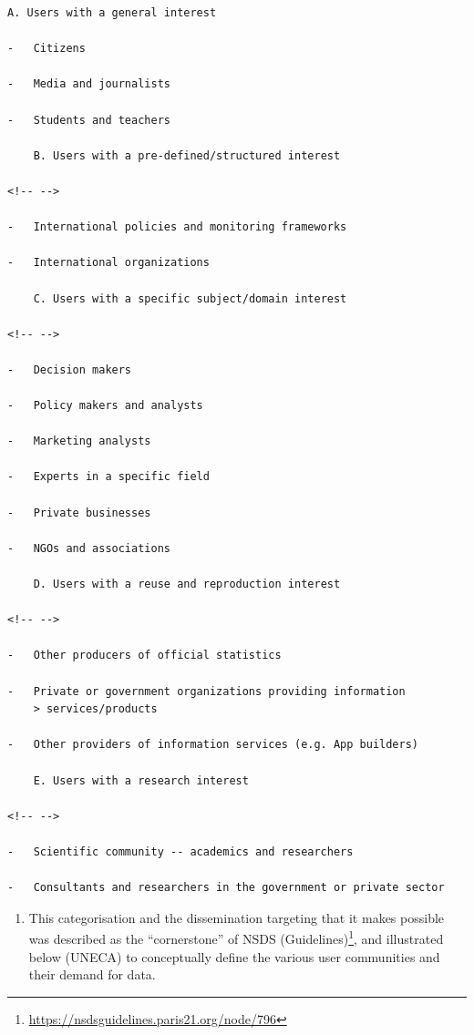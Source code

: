 \documentclass[
]{article}
\providecommand{\tightlist}{%
  \setlength{\itemsep}{0pt}\setlength{\parskip}{0pt}}
\begin{document}
\begin{verbatim}
A. Users with a general interest

-   Citizens

-   Media and journalists

-   Students and teachers

    B. Users with a pre-defined/structured interest

<!-- -->

-   International policies and monitoring frameworks

-   International organizations

    C. Users with a specific subject/domain interest

<!-- -->

-   Decision makers

-   Policy makers and analysts

-   Marketing analysts

-   Experts in a specific field

-   Private businesses

-   NGOs and associations

    D. Users with a reuse and reproduction interest

<!-- -->

-   Other producers of official statistics

-   Private or government organizations providing information
    > services/products

-   Other providers of information services (e.g. App builders)

    E. Users with a research interest

<!-- -->

-   Scientific community -- academics and researchers

-   Consultants and researchers in the government or private sector
\end{verbatim}

\begin{enumerate}
\def\labelenumi{\arabic{enumi}.}
\setcounter{enumi}{517}
\tightlist
\item
  This categorisation and the dissemination targeting that it makes
  possible was described as the ``cornerstone'' of NSDS
  (Guidelines)\footnote{\url{https://nsdsguidelines.paris21.org/node/796}}, and illustrated below (UNECA) to conceptually
  define the various user communities and their demand for data.
\end{enumerate}
\end{document}
